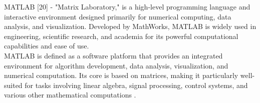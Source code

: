 \documentclass[12pt,a4paper]{article}
\begin{document}
\hspace{2em}MATLAB [20] - "Matrix Laboratory," is a high-level programming language and interactive environment designed primarily for numerical computing, data analysis, and visualization. Developed by MathWorks, MATLAB is widely used in engineering, scientific research, and academia for its powerful computational capabilities and ease of use.\\

\hspace{1em}MATLAB is defined as a software platform that provides an integrated environment for algorithm development, data analysis, visualization, and numerical computation. Its core is based on matrices, making it particularly well-suited for tasks involving linear algebra, signal processing, control systems, and various other mathematical computations .
\end{document}
